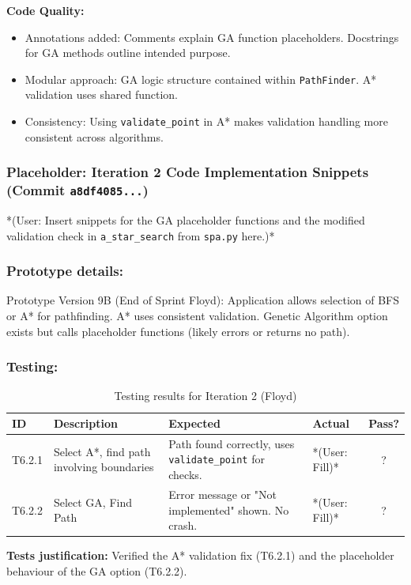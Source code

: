 \textbf{Code Quality:}
\begin{itemize}
	\item Annotations added: Comments explain GA function placeholders. Docstrings for GA methods outline intended purpose.
	\item Modular approach: GA logic structure contained within \verb|PathFinder|. A* validation uses shared function.
	\item Consistency: Using \verb|validate_point| in A* makes validation handling more consistent across algorithms.
\end{itemize}

\newpage
\subsubsection*{Placeholder: Iteration 2 Code Implementation Snippets (Commit \verb|a8df4085...|)}
*(User: Insert snippets for the GA placeholder functions and the modified validation check in \verb|a_star_search| from \verb|spa.py| here.)*
\newpage

\subsubsection{Prototype details:}
Prototype Version 9B (End of Sprint Floyd): Application allows selection of BFS or A* for pathfinding. A* uses consistent validation. Genetic Algorithm option exists but calls placeholder functions (likely errors or returns no path).

\subsubsection{Testing:}
\begin{table}[htbp]
	\centering
	\begin{tabularx}{\textwidth}{|l|X|p{4.5cm}|p{1.5cm}|c|}
		\hline
		\textbf{ID} & \textbf{Description} & \textbf{Expected} & \textbf{Actual} & \textbf{Pass?} \\
		\hline
		T6.2.1 & Select A*, find path involving boundaries & Path found correctly, uses \verb|validate_point| for checks. & *(User: Fill)* & ? \\
		\hline
		T6.2.2 & Select GA, Find Path & Error message or "Not implemented" shown. No crash. & *(User: Fill)* & ? \\
		\hline
	\end{tabularx}
	\caption{Testing results for Iteration 2 (Floyd)}
\end{table}
\textbf{Tests justification:} Verified the A* validation fix (T6.2.1) and the placeholder behaviour of the GA option (T6.2.2).

